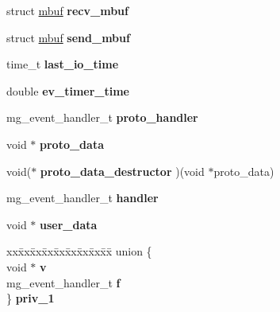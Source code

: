 \begin{DoxyCompactItemize}
\mbox{\label{structmg__connection_a72adb9aba4bbe59a9bd591de496713b3}} 
struct \hyperlink{structmbuf}{mbuf} {\bfseries recv\+\_\+mbuf}
\item 
\mbox{\label{structmg__connection_a70076f5da9c9d01e77acb3547941671c}} 
struct \hyperlink{structmbuf}{mbuf} {\bfseries send\+\_\+mbuf}
\item 
\mbox{\label{structmg__connection_aaf0f39b26deef84e6c204a176ea1e50a}} 
time\+\_\+t {\bfseries last\+\_\+io\+\_\+time}
\item 
\mbox{\label{structmg__connection_a84d1a7e42f1326c70f61f71e65082dc0}} 
double {\bfseries ev\+\_\+timer\+\_\+time}
\item 
\mbox{\label{structmg__connection_ae6b1f0d002253c0f80371fc5a7bbfc70}} 
mg\+\_\+event\+\_\+handler\+\_\+t {\bfseries proto\+\_\+handler}
\item 
\mbox{\label{structmg__connection_a7508851a3c070a1357c226781fa92bb7}} 
void $\ast$ {\bfseries proto\+\_\+data}
\item 
\mbox{\label{structmg__connection_a834e7757b28379b2ca0b8b6c51d7ba95}} 
void($\ast$ {\bfseries proto\+\_\+data\+\_\+destructor} )(void $\ast$proto\+\_\+data)
\item 
\mbox{\label{structmg__connection_a1f14bd154357c301cce137c9ac1d1edb}} 
mg\+\_\+event\+\_\+handler\+\_\+t {\bfseries handler}
\item 
\mbox{\label{structmg__connection_ab6d66a4eacc5d4d15f817ce98f26322d}} 
void $\ast$ {\bfseries user\+\_\+data}
\item 
\mbox{\label{structmg__connection_ad4386d39d9feedc547a1b1fcc8c5c7de}} 
\begin{tabbing}
xx\=xx\=xx\=xx\=xx\=xx\=xx\=xx\=xx\=\kill
union \{\\
\>void $\ast$ {\bfseries v}\\
\>mg\_event\_handler\_t {\bfseries f}\\
\} {\bfseries priv\_1}\\


\end{tabbing}
\end{DoxyCompactItemize}
